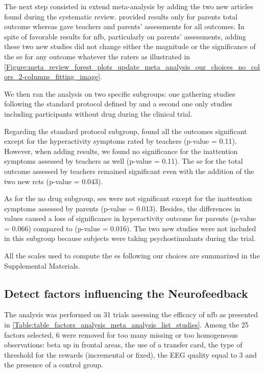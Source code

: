 The next step consisted in extend \citeauthor{Cortese2016} meta-analysis by adding the two new articles \citep{Strehl2017, Baumeister2016} found 
during the systematic review. \citet{Baumeister2016} provided results only for parents total outcome whereas \citet{Strehl2017} gave teachers 
and parents' assessments for all outcomes. In spite of favorable results for \gls{nfb}, particularly on parents' assessments, adding these two 
new studies did not change either the magnitude or the significance of the \gls{se} for any outcome whatever the raters
as illustrated in \ref{Figure:meta_review_forest_plots_update_meta_analysis_our_choices_no_colors_2-columns_fitting_image}. 
 
We then ran the analysis on two specific subgroups: one gathering studies following the standard protocol defined by \citet{Arns2014}
and a second one only studies including participants without drug during the clinical trial. 

Regarding the standard protocol subgroup, \citet{Cortese2016} found all the outcomes significant except for the hyperactivity symptoms 
rated by teachers (p-value = 0.11). However, when adding \citep{Strehl2017} results, we found no significance for the inattention symptoms assessed by 
teachers as well (p-value = 0.11). The \gls{se} for the total outcome assessed by teachers remained significant even with the addition of the two new
\glspl{rct} (p-value = 0.043).

As for the no drug subgroup, \glspl{se} were not significant except for the inattention symptoms assessed by parents (p-value = 0.013). 
Besides, the differences in \citet{Arnold2014} values caused a loss of significance in hyperactivity outcome for parents (p-value = 0.066)
compared to \citet{Cortese2016} (p-value = 0.016). The two new studies were not 
included in this subgroup because subjects were taking psychostimulants during the trial.

All the scales used to compute the \gls{es} following our choices are summarized in the Supplemental Materials.

\subsection{Detect factors influencing the Neurofeedback}

The analysis was performed on 31 trials assessing the efficacy of \gls{nfb} as presented in \ref{Table:table_factors_analysis_meta_analysis_list_studies}. 
Among the 25 factors selected, 6 were removed for too many missing or too homogeneous observations: beta up in frontal areas, 
the use of a transfer card, the type of threshold for the rewards (incremental or fixed), the EEG quality equal to 3 and the presence of a control group. 

